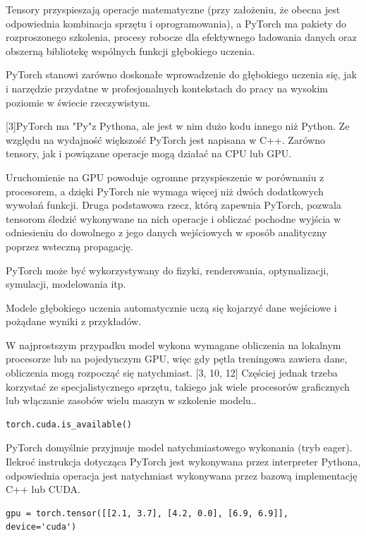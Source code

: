 \documentclass[brudnopis]{xmgr}
\begin{document}
 Tensory przyspieszają operacje matematyczne (przy założeniu, że obecna jest odpowiednia kombinacja sprzętu i oprogramowania), a PyTorch ma pakiety do rozproszonego szkolenia, procesy robocze dla efektywnego ładowania danych oraz obszerną bibliotekę wspólnych funkcji głębokiego uczenia.

PyTorch stanowi zarówno doskonałe wprowadzenie do głębokiego uczenia się, jak i narzędzie przydatne w profesjonalnych kontekstach do pracy na wysokim poziomie w świecie rzeczywistym.

[3]PyTorch ma "Py"z Pythona, ale jest w nim dużo kodu innego niż Python. 
Ze względu na wydajność większość PyTorch jest napisana w C++. 
Zarówno tensory, jak i powiązane operacje mogą działać na CPU lub GPU. 

Uruchomienie na GPU powoduje ogromne przyspieszenie w porównaniu z procesorem, a dzięki PyTorch nie wymaga więcej niż dwóch dodatkowych wywołań funkcji. Druga podstawowa rzecz, którą zapewnia PyTorch, pozwala tensorom śledzić wykonywane na nich operacje i obliczać pochodne wyjścia w odniesieniu do dowolnego z jego danych wejściowych w sposób analityczny poprzez wsteczną propagację. 

PyTorch może być wykorzystywany do fizyki, renderowania, optymalizacji, symulacji, modelowania itp. 

Modele głębokiego uczenia automatycznie uczą się kojarzyć dane wejściowe i pożądane wyniki z przykładów.

W najprostszym przypadku model wykona wymagane obliczenia na lokalnym procesorze lub na pojedynczym GPU, więc gdy pętla treningowa zawiera dane, obliczenia mogą rozpocząć się natychmiast. [3, 10, 12] Częściej jednak trzeba korzystać ze specjalistycznego sprzętu, takiego jak wiele procesorów graficznych lub włączanie zasobów wielu maszyn w szkolenie modelu.. 


\begin{lstlisting}
torch.cuda.is_available()
\end{lstlisting}


PyTorch domyślnie przyjmuje model natychmiastowego wykonania (tryb eager).
Ilekroć instrukcja dotycząca PyTorch jest wykonywana przez interpreter Pythona, odpowiednia operacja jest natychmiast wykonywana przez bazową implementację C++ lub CUDA. 


\begin{lstlisting}
gpu = torch.tensor([[2.1, 3.7], [4.2, 0.0], [6.9, 6.9]], device='cuda')
\end{lstlisting}
\end{document}
